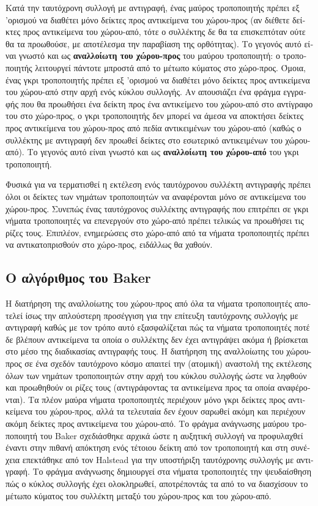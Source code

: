 \begin{greek}
Κατά την ταυτόχρονη συλλογή με αντιγραφή, ένας μαύρος
τροποποιητής πρέπει εξ 'ορισμού να διαθέτει μόνο δείκτες
προς αντικείμενα του χώρου-προς (αν διέθετε δείκτες
προς αντικείμενα του χώρου-από, τότε ο συλλέκτης δε θα
τα επισκεπτόταν ούτε θα τα προωθούσε, με αποτέλεσμα την
παραβίαση της ορθότητας). Το γεγονός αυτό είναι γνωστό
και ως \textbf{αναλλοίωτη του χώρου-προς} του μαύρου
τροποποιητή: ο τροποποιητής λειτουργεί πάντοτε μπροστά από
το μέτωπο κύματος στο χώρο-προς. Όμοια, ένας γκρι
τροποποιητής πρέπει εξ 'ορισμού να διαθέτει μόνο δείκτες
προς αντικείμενα του χώρου-από στην αρχή ενός κύκλου
συλλογής. Αν απουσιάζει ένα φράγμα εγγραφής που θα προωθήσει
ένα δείκτη προς ένα αντικείμενο του χώρου-από στο αντίγραφο
του στο χώρο-προς, ο γκρι τροποποιητής δεν μπορεί να άμεσα
να αποκτήσει δείκτες προς αντικείμενα του χώρου-προς από
πεδία αντικειμένων του χώρου-από (καθώς ο συλλέκτης με
αντιγραφή δεν προωθεί δείκτες στο εσωτερικό αντικειμένων του
χώρου-από). Το γεγονός αυτό είναι γνωστό και ως
\textbf{αναλλοίωτη του χώρου-από} του γκρι τροποποιητή.

Φυσικά για να τερματισθεί η εκτέλεση ενός ταυτόχρονου
συλλέκτη αντιγραφής πρέπει όλοι οι δείκτες των νημάτων
τροποποιητών να αναφέρονται μόνο σε αντικείμενα του χώρου-προς.
Συνεπώς ένας ταυτόχρονος συλλέκτης αντιγραφής που επιτρέπει
σε γκρι νήματα τροποποιητές να επενεργούν στο χώρο-από
πρέπει τελικώς να προωθήσει τις ρίζες τους. Επιπλέον,
ενημερώσεις στο χώρο-από από τα νήματα τροποποιητές πρέπει
να αντικατοπρισθούν στο χώρο-προς, ειδάλλως θα χαθούν. 

\subsection{Ο αλγόριθμος του Baker}
Η διατήρηση της αναλλοίωτης του χώρου-προς από όλα τα
νήματα τροποποιητές αποτελεί ίσως την απλούστερη προσέγγιση
για την επίτευξη ταυτόχρονης συλλογής με αντιγραφή καθώς
με τον τρόπο αυτό εξασφαλίζεται πώς τα νήματα τροποποιητές
ποτέ δε βλέπουν αντικείμενα τα οποία ο συλλέκτης δεν έχει
αντιγράψει ακόμα ή βρίσκεται στο μέσο της διαδικασίας αντιγραφής
τους. Η διατήρηση της αναλλοίωτης του χώρου-προς σε ένα
σχεδόν ταυτόχρονο κόσμο απαιτεί την (ατομική) αναστολή της
εκτέλεσης όλων των νημάτων τροποποιητών στην αρχή του
κύκλου συλλογής ώστε να ληφθούν και προωθηθούν οι ρίζες
τους (αντιγράφοντας τα αντικείμενα προς τα οποία αναφέρονται).
Τα πλέον μαύρα νήματα τροποποιητές περιέχουν μόνο γκρι δείκτες
προς αντικείμενα του χώρου-προς, αλλά τα τελευταία δεν έχουν
σαρωθεί ακόμη και περιέχουν ακόμη δείκτες προς αντικείμενα
του χώρου-από. Το φράγμα ανάγνωσης μαύρου τροποποιητή του
Baker \cite{DBLP:journals/cacm/Baker78} σχεδιάσθηκε αρχικά
ώστε η αυξητική συλλογή να προφυλαχθεί έναντι στην πιθανή
απόκτηση ενός τέτοιου δείκτη από τον τροποποιητή και στη
συνέχεια επεκτάθηκε από τον Halstead \cite{DBLP:journals/toplas/Halstead85}
για την υποστήριξη ταυτόχρονης συλλογής με αντιγραφή.
Το φράγμα ανάγνωσης δημιουργεί στα νήματα τροποποιητές
την ψευδαίσθηση πώς ο κύκλος συλλογής έχει ολοκληρωθεί,
αποτρέποντάς τα από το να διασχίσουν το μέτωπο κύματος
του συλλέκτη μεταξύ του χώρου-προς και του χώρου-από.


\end{greek}
